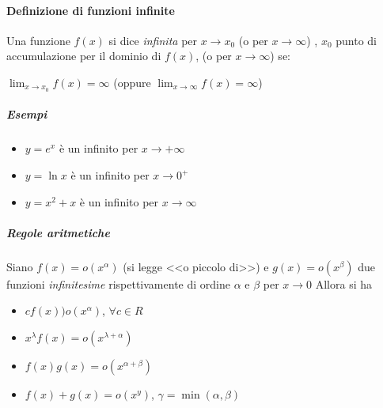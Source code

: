 \paragraph{Definizione di funzioni infinite}
Una funzione $f(x)$ si dice \textit{infinita} per $x\to x_0$ (o per $x \to \infty$) , $x_0$ punto di accumulazione per il dominio di $f(x)$, (o per $x\to \infty$) se:
\begin {center}
	$\lim_{x\to x_0}f(x)=\infty$ (oppure $\lim_{x\to \infty}f(x)=\infty$)
\end{center}
\subparagraph{Esempi}
\begin{itemize}
	\item $y=e^x$ è un infinito per $x\to +\infty$
	\item $y=\ln{x}$ è un infinito per $x\to 0^+$
	\item $y=x^2+x$ è un infinito per $x\to \infty$
\end{itemize}
\subparagraph{Regole aritmetiche}
Siano $f(x)=o(x^\alpha)$ (si legge <<o piccolo di>>) e $g(x)=o(x^\beta)$ due funzioni \textit{infinitesime} rispettivamente di ordine $\alpha$ e $\beta$ per $x \to 0$ Allora si ha
\begin{itemize}
	\item $cf(x))o(x^\alpha)$, $\forall c \in R$
	\item $x^\lambda f(x)=o(x^{\lambda+\alpha})$
	\item $f(x)g(x)=o(x^{\alpha+\beta})$
	\item $f(x)+g(x)=o(x^y)$, $\gamma=\min(\alpha,\beta)$
\end{itemize}
